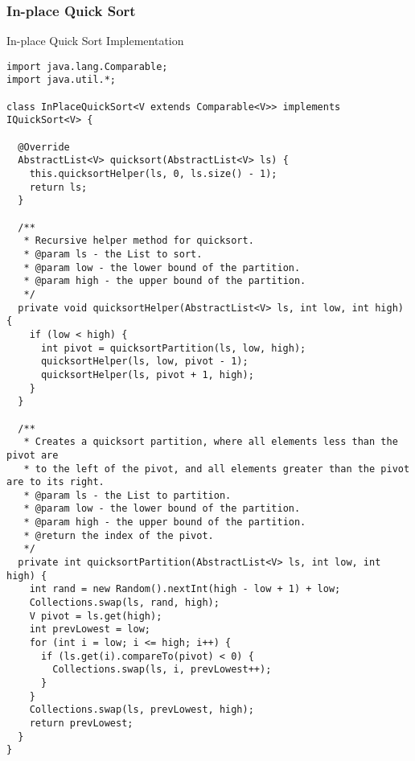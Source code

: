 \subsubsection*{In-place Quick Sort}
\begin{cl}[]{In-place Quick Sort Implementation}
\begin{lstlisting}[language=MyJava]
import java.lang.Comparable;
import java.util.*;

class InPlaceQuickSort<V extends Comparable<V>> implements IQuickSort<V> {

  @Override
  AbstractList<V> quicksort(AbstractList<V> ls) {
    this.quicksortHelper(ls, 0, ls.size() - 1);
    return ls;
  }

  /**
   * Recursive helper method for quicksort.
   * @param ls - the List to sort.
   * @param low - the lower bound of the partition.
   * @param high - the upper bound of the partition.
   */
  private void quicksortHelper(AbstractList<V> ls, int low, int high) {
    if (low < high) {
      int pivot = quicksortPartition(ls, low, high);
      quicksortHelper(ls, low, pivot - 1);
      quicksortHelper(ls, pivot + 1, high);
    }
  }

  /**
   * Creates a quicksort partition, where all elements less than the pivot are
   * to the left of the pivot, and all elements greater than the pivot are to its right.
   * @param ls - the List to partition.
   * @param low - the lower bound of the partition.
   * @param high - the upper bound of the partition.
   * @return the index of the pivot.
   */
  private int quicksortPartition(AbstractList<V> ls, int low, int high) {
    int rand = new Random().nextInt(high - low + 1) + low;
    Collections.swap(ls, rand, high);
    V pivot = ls.get(high);
    int prevLowest = low;
    for (int i = low; i <= high; i++) {
      if (ls.get(i).compareTo(pivot) < 0) {
        Collections.swap(ls, i, prevLowest++);
      }
    }
    Collections.swap(ls, prevLowest, high);
    return prevLowest;
  }
}
\end{lstlisting}
\end{cl}
